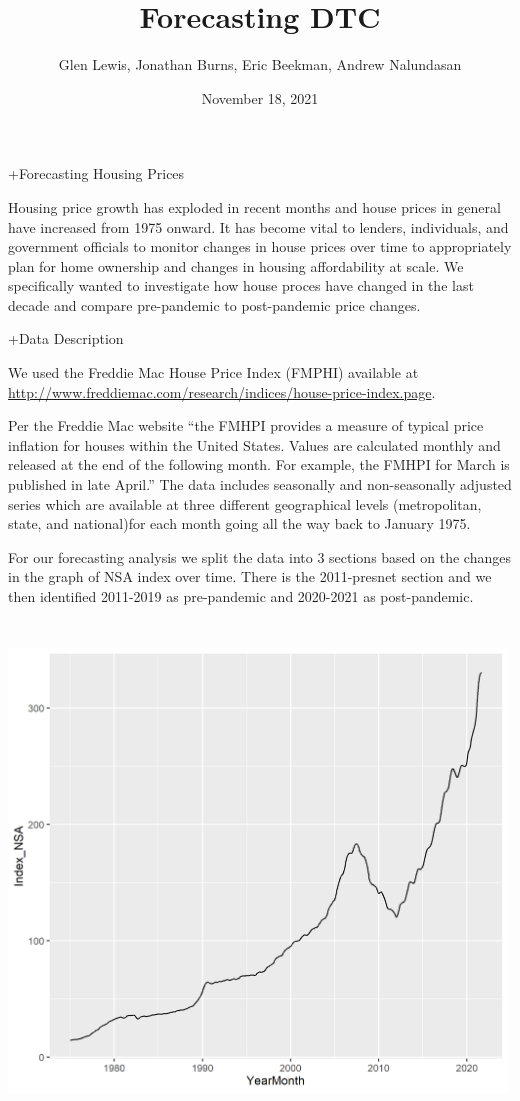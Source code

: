 \documentclass[
]{article}
\title{Forecasting DTC}
\author{Glen Lewis, Jonathan Burns, Eric Beekman, Andrew Nalundasan}
\date{November 18, 2021}
\begin{document}
\maketitle

{
\setcounter{tocdepth}{3}
\tableofcontents
}
+Forecasting Housing Prices

Housing price growth has exploded in recent months and house prices in
general have increased from 1975 onward. It has become vital to lenders,
individuals, and government officials to monitor changes in house prices
over time to appropriately plan for home ownership and changes in
housing affordability at scale. We specifically wanted to investigate
how house proces have changed in the last decade and compare
pre-pandemic to post-pandemic price changes.

+Data Description

We used the Freddie Mac House Price Index (FMPHI) available at
\url{http://www.freddiemac.com/research/indices/house-price-index.page}.

Per the Freddie Mac website ``the FMHPI provides a measure of typical
price inflation for houses within the United States. Values are
calculated monthly and released at the end of the following month. For
example, the FMHPI for March is published in late April.'' The data
includes seasonally and non-seasonally adjusted series which are
available at three different geographical levels (metropolitan, state,
and national)for each month going all the way back to January 1975.

For our forecasting analysis we split the data into 3 sections based on
the changes in the graph of NSA index over time. There is the
2011-presnet section and we then identified 2011-2019 as pre-pandemic
and 2020-2021 as post-pandemic.

\includegraphics[width=5.20833in,height=5.20833in]{NSA-graph.png}
\end{document}
